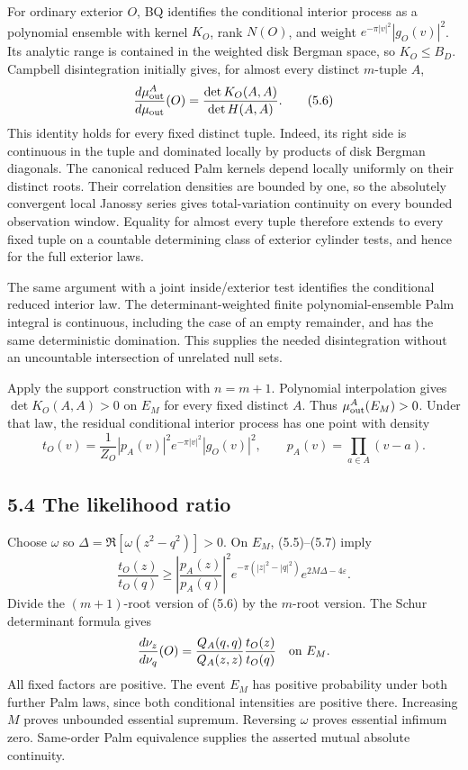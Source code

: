 \documentclass[11pt,a4paper]{article}
\theoremstyle{definition}
\theoremstyle{remark}
\numberwithin{equation}{section}
\begin{document}
For ordinary exterior \(O\), BQ identifies the conditional interior process as a polynomial ensemble with kernel \(K_O\), rank \(N(O)\), and weight \(e^{-\pi|v|^2}|g_O(v)|^2\). Its analytic range is contained in the weighted disk Bergman space, so \(K_O\le B_D\). Campbell disintegration initially gives, for almost every distinct \(m\)-tuple \(A\), \[
\frac{d\mu^A_{\rm out}}{d\mu_{\rm out}}(O)
=\frac{\det K_O(A,A)}{\det H(A,A)}.
\tag{5.6}
\] This identity holds for every fixed distinct tuple. Indeed, its right side is continuous in the tuple and dominated locally by products of disk Bergman diagonals. The canonical reduced Palm kernels depend locally uniformly on their distinct roots. Their correlation densities are bounded by one, so the absolutely convergent local Janossy series gives total-variation continuity on every bounded observation window. Equality for almost every tuple therefore extends to every fixed tuple on a countable determining class of exterior cylinder tests, and hence for the full exterior laws.

The same argument with a joint inside/exterior test identifies the conditional reduced interior law. The determinant-weighted finite polynomial-ensemble Palm integral is continuous, including the case of an empty remainder, and has the same deterministic domination. This supplies the needed disintegration without an uncountable intersection of unrelated null sets.

Apply the support construction with \(n=m+1\). Polynomial interpolation gives \(\det K_O(A,A)>0\) on \(E_M\) for every fixed distinct \(A\). Thus \(\mu^A_{\rm out}(E_M)>0\). Under that law, the residual conditional interior process has one point with density \[
t_O(v)=\frac1{Z_O}
 |p_A(v)|^2e^{-\pi|v|^2}|g_O(v)|^2,\qquad
p_A(v)=\prod_{a\in A}(v-a).
\tag{5.7}
\]

\hypertarget{the-likelihood-ratio}{%
\subsection{5.4 The likelihood ratio}\label{the-likelihood-ratio}}

Choose \(\omega\) so \(\Delta=\Re[\omega(z^2-q^2)]>0\). On \(E_M\), (5.5)--(5.7) imply \[
\frac{t_O(z)}{t_O(q)}
\ge
\left|\frac{p_A(z)}{p_A(q)}\right|^2
 e^{-\pi(|z|^2-|q|^2)}e^{2M\Delta-4\varepsilon}.
\] Divide the \((m+1)\)-root version of (5.6) by the \(m\)-root version. The Schur determinant formula gives \[
\frac{d\nu_z}{d\nu_q}(O)
=\frac{Q_A(q,q)}{Q_A(z,z)}\frac{t_O(z)}{t_O(q)}
\quad\hbox{on }E_M.
\] All fixed factors are positive. The event \(E_M\) has positive probability under both further Palm laws, since both conditional intensities are positive there. Increasing \(M\) proves unbounded essential supremum. Reversing \(\omega\) proves essential infimum zero. Same-order Palm equivalence supplies the asserted mutual absolute continuity.
\end{document}
